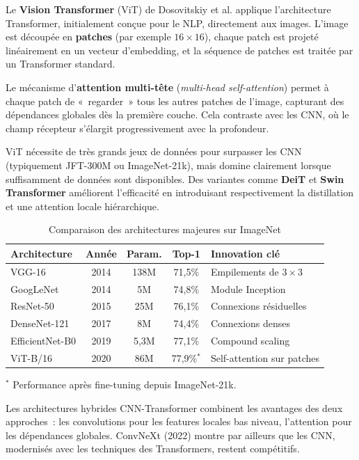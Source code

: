 \documentclass[a4paper,11pt,twoside]{book}
\begin{document}
Le \textbf{Vision Transformer} (ViT) de Dosovitskiy et al. applique l'architecture Transformer, initialement conçue pour le NLP, directement aux images. L'image est découpée en \textbf{patches} (par exemple $16 \times 16$), chaque patch est projeté linéairement en un vecteur d'embedding, et la séquence de patches est traitée par un Transformer standard.

Le mécanisme d'\textbf{attention multi-tête} (\textit{multi-head self-attention}) permet à chaque patch de «~regarder~» tous les autres patches de l'image, capturant des dépendances globales dès la première couche. Cela contraste avec les CNN, où le champ récepteur s'élargit progressivement avec la profondeur.

ViT nécessite de très grands jeux de données pour surpasser les CNN (typiquement JFT-300M ou ImageNet-21k), mais domine clairement lorsque suffisamment de données sont disponibles. Des variantes comme \textbf{DeiT} et \textbf{Swin Transformer} améliorent l'efficacité en introduisant respectivement la distillation et une attention locale hiérarchique.

\begin{table}[H]
\centering
\caption{Comparaison des architectures majeures sur ImageNet}
\begin{tabularx}{\textwidth}{l c c c X}
\toprule
\textbf{Architecture} & \textbf{Année} & \textbf{Param.} & \textbf{Top-1} & \textbf{Innovation clé} \\
\midrule
VGG-16 & 2014 & 138M & 71,5\% & Empilements de $3 \times 3$ \\
GoogLeNet & 2014 & 5M & 74,8\% & Module Inception \\
ResNet-50 & 2015 & 25M & 76,1\% & Connexions résiduelles \\
DenseNet-121 & 2017 & 8M & 74,4\% & Connexions denses \\
EfficientNet-B0 & 2019 & 5,3M & 77,1\% & Compound scaling \\
ViT-B/16 & 2020 & 86M & 77,9\%$^*$ & Self-attention sur patches \\
\bottomrule
\end{tabularx}
\par\medskip
\small $^*$ Performance après fine-tuning depuis ImageNet-21k.
\end{table}

\begin{notebox}
Les architectures hybrides CNN-Transformer combinent les avantages des deux approches~: les convolutions pour les features locales bas niveau, l'attention pour les dépendances globales. ConvNeXt (2022) montre par ailleurs que les CNN, modernisés avec les techniques des Transformers, restent compétitifs.
\end{notebox}
\end{document}
